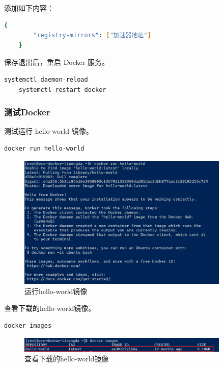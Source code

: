 \documentclass{article}
\begin{document}
添加如下内容：

\begin{lstlisting}[language=bash]
    {
        "registry-mirrors": ["加速器地址"]
    }
\end{lstlisting}

保存退出后，重启 Docker 服务。

\begin{lstlisting}[language=bash]
    systemctl daemon-reload
    systemctl restart docker
\end{lstlisting}

\subsubsection{测试Docker}

测试运行 hello-world 镜像。

\begin{lstlisting}[language=bash]
    docker run hello-world
\end{lstlisting}

\begin{figure}[H]
\centering
\includegraphics[width=0.9\textwidth]{img/1.7.1.png}
\caption{运行hello-world镜像}
\end{figure}

查看下载的hello-world镜像。

\begin{lstlisting}[language=bash]
    docker images
\end{lstlisting}

\begin{figure}[H]
\centering
\includegraphics[width=0.9\textwidth]{img/0.3.png}
\caption{查看下载的hello-world镜像}
\end{figure}
\end{document}

